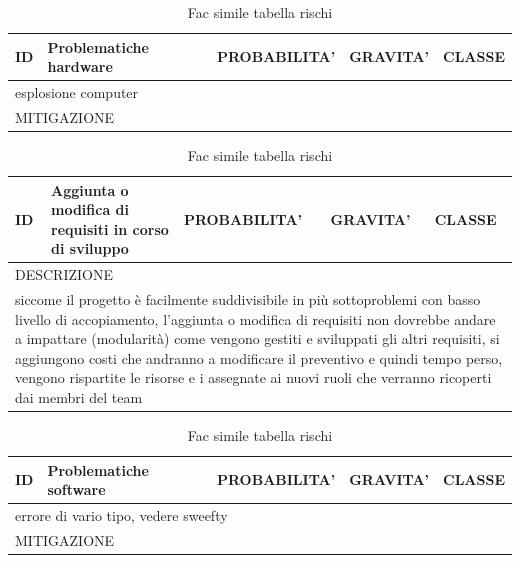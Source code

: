 	\begin{table}[H]
		\centering
		\begin{tabularx}{\columnwidth}{|m{1.5cm}|m{4.2cm}|m{2.7cm}|m{2.7cm}|m{2.7cm}|}
			\hline
			ID & 
			Problematiche hardware & 
			PROBABILITA' & 
			GRAVITA' & 
			CLASSE\\
			\hline
			\multicolumn{5}{|X|}{
				esplosione computer
			}\\
			\hline
			\multicolumn{5}{|X|}{
				MITIGAZIONE
			}\\
			\hline
		\end{tabularx}
		\caption{Fac simile tabella rischi}
	\end{table}
	
	\begin{table}[H]
		\centering
		\begin{tabularx}{\columnwidth}{|m{1.5cm}|m{4.2cm}|m{2.7cm}|m{2.7cm}|m{2.7cm}|}
			\hline
			ID & 
			Aggiunta o modifica di requisiti in corso di sviluppo & 
			PROBABILITA' & 
			GRAVITA' & 
			CLASSE\\
			\hline
			\multicolumn{5}{|X|}{
				DESCRIZIONE
			}\\
			\hline
			\multicolumn{5}{|X|}{
				siccome il progetto è facilmente suddivisibile in più sottoproblemi con basso livello di accopiamento, l'aggiunta o modifica di requisiti non dovrebbe andare a impattare (modularità) come vengono gestiti e sviluppati gli altri requisiti, si aggiungono costi che andranno a modificare il preventivo e quindi tempo perso, vengono rispartite le risorse e i assegnate ai nuovi ruoli che verranno ricoperti dai membri del team
			}\\
			\hline
		\end{tabularx}
		\caption{Fac simile tabella rischi}
	\end{table}
	
	\begin{table}[H]
		\centering
		\begin{tabularx}{\columnwidth}{|m{1.5cm}|m{4.2cm}|m{2.7cm}|m{2.7cm}|m{2.7cm}|}
			\hline
			ID & 
			Problematiche software & 
			PROBABILITA' & 
			GRAVITA' & 
			CLASSE\\
			\hline
			\multicolumn{5}{|X|}{
				errore di vario tipo, vedere sweefty
			}\\
			\hline
			\multicolumn{5}{|X|}{
				MITIGAZIONE
			}\\
			\hline
		\end{tabularx}
		\caption{Fac simile tabella rischi}
	\end{table}

